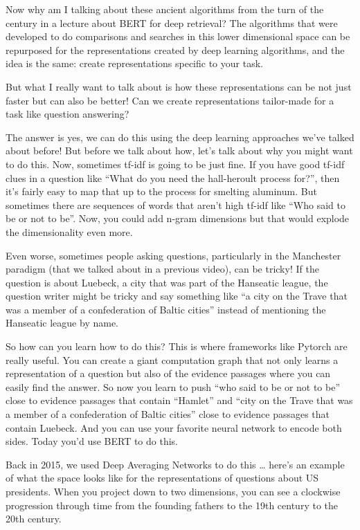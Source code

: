 Now why am I talking about these ancient algorithms from the turn of the century in a lecture about BERT for deep retrieval?  The algorithms that were developed to do comparisons and searches in this lower dimensional space can be repurposed for the representations created by deep learning algorithms, and the idea is the same: create representations specific to your task.

But what I really want to talk about is how these representations can be not just faster but can also be better!  Can we create representations tailor-made for a task like question answering?

The answer is yes, we can do this using the deep learning approaches we’ve talked about before!  But before we talk about how, let’s talk about why you might want to do this.  Now, sometimes tf-idf is going to be just fine.  If you have good tf-idf clues in a question like “What do you need the hall-heroult process for?”, then it’s fairly easy to map that up to the process for smelting aluminum.  But sometimes there are sequences of words that aren’t high tf-idf like “Who said to be or not to be”.  Now, you could add n-gram dimensions but that would explode the dimensionality even more.  

Even worse, sometimes people asking questions, particularly in the Manchester paradigm (that we talked about in a previous video), can be tricky!  If the question is about Luebeck, a city that was part of the Hanseatic league, the question writer might be tricky and say something like “a city on the Trave that was a member of a confederation of Baltic cities” instead of mentioning the Hanseatic league by name.

So how can you learn how to do this?  This is where frameworks like Pytorch are really useful.  You can create a giant computation graph that not only learns a representation of a question but also of the evidence passages where you can easily find the answer.  So now you learn to push “who said to be or not to be” close to evidence passages that contain “Hamlet” and “city on the Trave that was a member of a confederation of Baltic cities” close to evidence passages that contain Luebeck.  And you can use your favorite neural network to encode both sides.  Today you’d use BERT to do this.

Back in 2015, we used Deep Averaging Networks to do this … here’s an example of what the space looks like for the representations of questions about US presidents.  When you project down to two dimensions, you can see a clockwise progression through time from the founding fathers to the 19th century to the 20th century.

